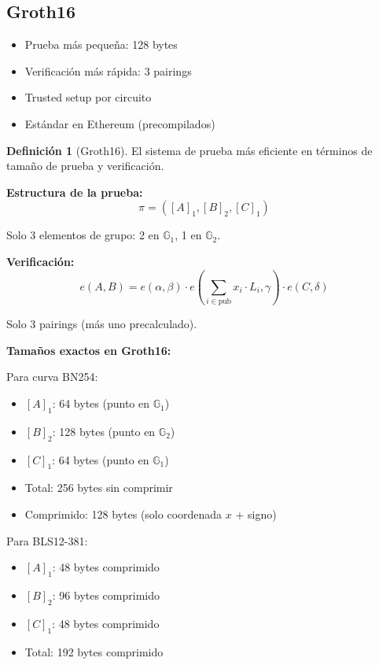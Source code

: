 \documentclass[11pt,a4paper,twoside,openright]{book}
\theoremstyle{definition}
\newtheorem{definition}{Definición}[chapter]
\theoremstyle{plain}
\theoremstyle{remark}
\begin{document}
\subsection{Groth16}

\begin{itemize}
    \item Prueba más pequeña: 128 bytes
    \item Verificación más rápida: 3 pairings
    \item Trusted setup por circuito
    \item Estándar en Ethereum (precompilados)
\end{itemize}

\begin{definition}[Groth16]
El sistema de prueba más eficiente en términos de tamaño de prueba y verificación.

\textbf{Estructura de la prueba:}
\[ \pi = ([A]_1, [B]_2, [C]_1) \]

Solo 3 elementos de grupo: 2 en $\mathbb{G}_1$, 1 en $\mathbb{G}_2$.

\textbf{Verificación:}
\[ e(A, B) = e(\alpha, \beta) \cdot e(\sum_{i \in \text{pub}} x_i \cdot L_i, \gamma) \cdot e(C, \delta) \]

Solo 3 pairings (más uno precalculado).
\end{definition}

\begin{mathnote}
\textbf{Tamaños exactos en Groth16:}

Para curva BN254:
\begin{itemize}
    \item $[A]_1$: 64 bytes (punto en $\mathbb{G}_1$)
    \item $[B]_2$: 128 bytes (punto en $\mathbb{G}_2$)
    \item $[C]_1$: 64 bytes (punto en $\mathbb{G}_1$)
    \item Total: 256 bytes sin comprimir
    \item Comprimido: 128 bytes (solo coordenada $x$ + signo)
\end{itemize}

Para BLS12-381:
\begin{itemize}
    \item $[A]_1$: 48 bytes comprimido
    \item $[B]_2$: 96 bytes comprimido
    \item $[C]_1$: 48 bytes comprimido
    \item Total: 192 bytes comprimido
\end{itemize}
\end{mathnote}
\end{document}
